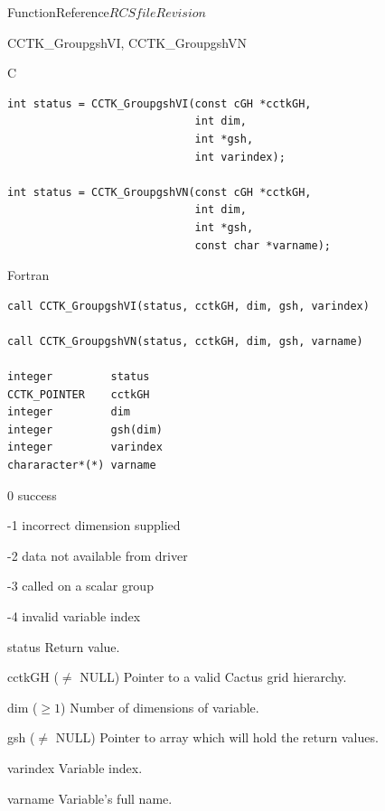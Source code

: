 \begin{cactuspart}{FunctionReference}{$RCSfile$}{$Revision$}
\begin{FunctionDescription}{CCTK\_GroupgshVI, CCTK\_GroupgshVN}
\begin{SynopsisSection}
\begin{Synopsis}{C}
\begin{verbatim}
int status = CCTK_GroupgshVI(const cGH *cctkGH,
                             int dim,
                             int *gsh,
                             int varindex);

int status = CCTK_GroupgshVN(const cGH *cctkGH,
                             int dim,
                             int *gsh,
                             const char *varname);
\end{verbatim}
\end{Synopsis}
\begin{Synopsis}{Fortran}
\begin{verbatim}
call CCTK_GroupgshVI(status, cctkGH, dim, gsh, varindex)

call CCTK_GroupgshVN(status, cctkGH, dim, gsh, varname)

integer         status
CCTK_POINTER    cctkGH
integer         dim
integer         gsh(dim)
integer         varindex
chararacter*(*) varname
\end{verbatim}
\end{Synopsis}
\end{SynopsisSection}

\begin{ResultSection}
\begin{Result}{\rm 0} success \end{Result}
\begin{Result}{\rm -1} incorrect dimension supplied \end{Result}
\begin{Result}{\rm -2} data not available from driver \end{Result}
\begin{Result}{\rm -3} called on a scalar group \end{Result}
\begin{Result}{\rm -4} invalid variable index \end{Result}
\end{ResultSection}

\begin{ParameterSection}
\begin{Parameter}{status} Return value. \end{Parameter}
\begin{Parameter}{cctkGH ($\ne$ NULL)} Pointer to a valid Cactus grid hierarchy. \end{Parameter}
\begin{Parameter}{dim ($\ge 1$)} Number of dimensions of variable. \end{Parameter}
\begin{Parameter}{gsh ($\ne$ NULL)} Pointer to array which will hold the return values. \end{Parameter}
\begin{Parameter}{varindex} Variable index. \end{Parameter}
\begin{Parameter}{varname} Variable's full name. \end{Parameter}
\end{ParameterSection}


\end{FunctionDescription}
\end{cactuspart}
